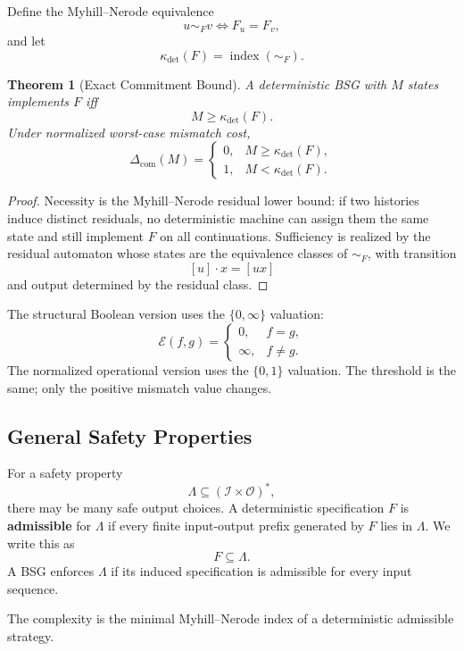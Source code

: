\documentclass[12pt]{article}
\newtheorem{theorem}{Theorem}[section]
\theoremstyle{definition}
\newcommand{\Com}{\Delta_{\mathrm{com}}}
\begin{document}
Define the Myhill--Nerode equivalence
\[
u\sim_F v
\iff
F_u=F_v,
\]
and let
\[
\kappa_{\det}(F)=\operatorname{index}(\sim_F).
\]

\begin{theorem}[Exact Commitment Bound]
\label{thm:commitment-spec}
A deterministic BSG with $M$ states implements $F$ iff
\[
M\ge\kappa_{\det}(F).
\]
Under normalized worst-case mismatch cost,
\[
\Com(M)=
\begin{cases}
0,&M\ge\kappa_{\det}(F),\\
1,&M<\kappa_{\det}(F).
\end{cases}
\]
\end{theorem}

\begin{proof}
Necessity is the Myhill--Nerode residual lower bound: if two histories induce
distinct residuals, no deterministic machine can assign them the same state and
still implement $F$ on all continuations.  Sufficiency is realized by the
residual automaton whose states are the equivalence classes of $\sim_F$, with
transition
\[
[u]\cdot x=[ux]
\]
and output determined by the residual class.
\end{proof}

The structural Boolean version uses the $\{0,\infty\}$ valuation:
\[
\mathcal E(f,g)=
\begin{cases}
0,&f=g,\\
\infty,&f\neq g.
\end{cases}
\]
The normalized operational version uses the $\{0,1\}$ valuation.  The threshold
is the same; only the positive mismatch value changes.

\subsection{General Safety Properties}
\label{subsec:safety}

For a safety property
\[
\Lambda\subseteq(\mathcal I\times\mathcal O)^*,
\]
there may be many safe output choices.  A deterministic specification $F$ is
\textbf{admissible} for $\Lambda$ if every finite input-output prefix generated
by $F$ lies in $\Lambda$.  We write this as
\[
F\subseteq\Lambda.
\]
A BSG enforces $\Lambda$ if its induced specification is admissible for every
input sequence.

The complexity is the minimal Myhill--Nerode index of a deterministic
admissible strategy.
\end{document}
